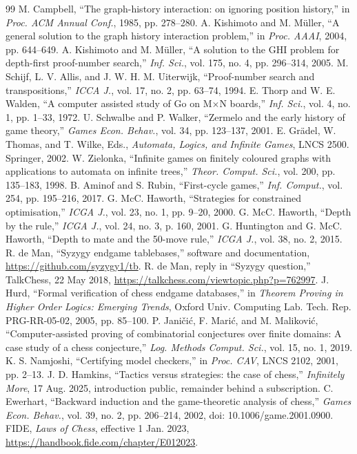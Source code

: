 \documentclass[journal]{IEEEtran}
\theoremstyle{definition}
\theoremstyle{remark}
\begin{document}
\begin{thebibliography}{99}\small
{} M. Campbell, ``The graph-history interaction: on ignoring position history,'' in \emph{Proc. ACM Annual Conf.}, 1985, pp. 278--280.
 A. Kishimoto and M. M\"uller, ``A general solution to the graph history interaction problem,'' in \emph{Proc. AAAI}, 2004, pp. 644--649.
 A. Kishimoto and M. M\"uller, ``A solution to the GHI problem for depth-first proof-number search,'' \emph{Inf. Sci.}, vol. 175, no. 4, pp. 296--314, 2005.
 M. Schijf, L. V. Allis, and J. W. H. M. Uiterwijk, ``Proof-number search and transpositions,'' \emph{ICCA J.}, vol. 17, no. 2, pp. 63--74, 1994.
 E. Thorp and W. E. Walden, ``A computer assisted study of Go on M$\times$N boards,'' \emph{Inf. Sci.}, vol. 4, no. 1, pp. 1--33, 1972.
 U. Schwalbe and P. Walker, ``Zermelo and the early history of game theory,'' \emph{Games Econ. Behav.}, vol. 34, pp. 123--137, 2001.
 E. Gr\"adel, W. Thomas, and T. Wilke, Eds., \emph{Automata, Logics, and Infinite Games}, LNCS 2500. Springer, 2002.
 W. Zielonka, ``Infinite games on finitely coloured graphs with applications to automata on infinite trees,'' \emph{Theor. Comput. Sci.}, vol. 200, pp. 135--183, 1998.
 B. Aminof and S. Rubin, ``First-cycle games,'' \emph{Inf. Comput.}, vol. 254, pp. 195--216, 2017.
 G. McC. Haworth, ``Strategies for constrained optimisation,'' \emph{ICGA J.}, vol. 23, no. 1, pp. 9--20, 2000.
 G. McC. Haworth, ``Depth by the rule,'' \emph{ICGA J.}, vol. 24, no. 3, p. 160, 2001.
 G. Huntington and G. McC. Haworth, ``Depth to mate and the 50-move rule,'' \emph{ICGA J.}, vol. 38, no. 2, 2015.
 R. de Man, ``Syzygy endgame tablebases,'' software and documentation, \url{https://github.com/syzygy1/tb}.
 R. de Man, reply in ``Syzygy question,'' TalkChess, 22 May 2018, \url{https://talkchess.com/viewtopic.php?p=762997}.
 J. Hurd, ``Formal verification of chess endgame databases,'' in \emph{Theorem Proving in Higher Order Logics: Emerging Trends}, Oxford Univ. Computing Lab. Tech. Rep. PRG-RR-05-02, 2005, pp. 85--100.
 P. Jani\v{c}i\'c, F. Mari\'c, and M. Malikovi\'c, ``Computer-assisted proving of combinatorial conjectures over finite domains: A case study of a chess conjecture,'' \emph{Log. Methods Comput. Sci.}, vol. 15, no. 1, 2019.
 K. S. Namjoshi, ``Certifying model checkers,'' in \emph{Proc. CAV}, LNCS 2102, 2001, pp. 2--13.
 J. D. Hamkins, ``Tactics versus strategies: the case of chess,'' \emph{Infinitely More}, 17 Aug. 2025, introduction public, remainder behind a subscription.
 C. Ewerhart, ``Backward induction and the game-theoretic analysis of chess,'' \emph{Games Econ. Behav.}, vol. 39, no. 2, pp. 206--214, 2002, doi: 10.1006/game.2001.0900.
 FIDE, \emph{Laws of Chess}, effective 1 Jan. 2023, \url{https://handbook.fide.com/chapter/E012023}.
\end{thebibliography}
\end{document}
